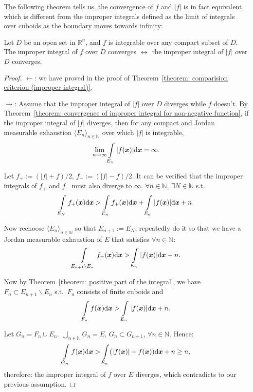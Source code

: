 \documentclass[openany]{book}
\begin{document}
The following theorem tells us, the convergence of $f$ and $|f|$ is in fact equivalent, which is different from the improper integrals defined as the limit of integrals over cuboids as the boundary moves towards infinity:
\begin{theorem}
	\label{theorem: equivalence of convergence and absolute convergence}
	Let $D$ be an open set in $\mathbb R^n$, and $f$ is integrable over any compact subset of $D$.
	The improper integral of $f$ over $D$ converges $\;\leftrightarrow\;$ the improper integral of $|f|$ over $D$ converges.
\end{theorem}
\begin{proof}
	$\gets$: we have proved in the proof of Theorem~\ref{theorem: comparision criterion (improper integral)}.

	$\to$: Assume that the improper integral of $|f|$ over $D$ diverges while $f$ doesn't. 
	By Theorem~\ref{theorem: convergence of improper integral for non-negative function}, if the improper integral of $|f|$ diverges, then for any compact and Jordan measurable exhaustion $\langle E_n \rangle_{n \in \mathbb N}$ over which $|f|$ is integrable, 
	\begin{equation*}
		\lim_{n \to \infty} \int\limits_{E_n} |f(\boldsymbol{x})| \mathrm{d} \boldsymbol{x} = \infty.
	\end{equation*}

	Let $f_+ := (|f| + f)/2$, $f_- := (|f| - f)/2$. 
	It can be verified that the improper integrals of $f_+$ and $f_-$ must also diverge to $\infty$. 
	$\forall n \in \mathbb N$, $\exists N \in \mathbb N$ s.t.\ 
	\begin{equation*}
		\int\limits_{E_N} f_+(\boldsymbol{x}) \mathrm{d} \boldsymbol{x} > \int\limits_{E_n} f_+(\boldsymbol{x}) \mathrm{d} \boldsymbol{x} + \int\limits_{E_n} |f(\boldsymbol{x})| \mathrm{d} \boldsymbol{x} + n.
	\end{equation*}

	Now rechoose $\langle E_n \rangle_{n \in \mathbb N}$ so that $E_{n+1} := E_N$, repeatedly do it so that we have a Jordan measurable exhaustion of $E$ that satisfies $\forall n \in \mathbb N$:
	\begin{equation*}
		\int\limits_{E_{n+1} \backslash E_n} f_+(\boldsymbol{x}) \mathrm{d} \boldsymbol{x} > \int\limits_{E_n} |f(\boldsymbol{x})| \mathrm{d} \boldsymbol{x} + n.
	\end{equation*}

	Now by Theorem~\ref{theorem: positive part of the integral}, we have $F_n \subset E_{n+1} \backslash E_n$ s.t.\ $F_n$ consists of finite cuboids and
	\begin{equation*}
		\int\limits_{F_n} f(\boldsymbol{x}) \mathrm{d} \boldsymbol{x} > \int\limits_{E_n} |f(\boldsymbol{x})| \mathrm{d} \boldsymbol{x} + n.
	\end{equation*}

	Let $G_n = F_n \cup E_n$. 
	$\bigcup_{n \in \mathbb N} G_n = E$, $G_n \subset G_{n+1}$, $\forall n \in \mathbb N$.
	Hence:
	\begin{equation*}
		\int\limits_{G_n} f(\boldsymbol{x}) \mathrm{d} \boldsymbol{x} > \int\limits_{E_n} (|f(\boldsymbol{x})| + f(\boldsymbol{x})) \mathrm{d} \boldsymbol{x} + n \geq n,
	\end{equation*}
	therefore: the improper integral of $f$ over $E$ diverges, which contradicts to our previous assumption.
\end{proof}
\end{document}
